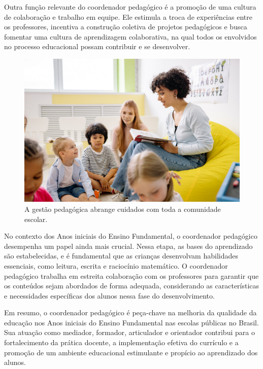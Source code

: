 Outra função relevante do coordenador pedagógico é a promoção de uma
cultura de colaboração e trabalho em equipe. Ele estimula a troca de
experiências entre os professores, incentiva a construção coletiva de
projetos pedagógicos e busca fomentar uma cultura de aprendizagem
colaborativa, na qual todos os envolvidos no processo educacional possam
contribuir e se desenvolver.

\begin{figure}
\centering
\includegraphics[width=\textwidth]{./imgs/Imagem003.jpg}
\caption{A gestão pedagógica abrange cuidados com toda a comunidade
escolar.}
\end{figure}

No contexto dos Anos iniciais do Ensino Fundamental, o coordenador
pedagógico desempenha um papel ainda mais crucial. Nessa etapa, as bases
do aprendizado são estabelecidas, e é fundamental que as crianças
desenvolvam habilidades essenciais, como leitura, escrita e raciocínio
matemático. O coordenador pedagógico trabalha em estreita colaboração
com os professores para garantir que os conteúdos sejam abordados de
forma adequada, considerando as características e necessidades
específicas dos alunos nessa fase do desenvolvimento.

Em resumo, o coordenador pedagógico é peça-chave na melhoria da
qualidade da educação nos Anos iniciais do Ensino Fundamental nas
escolas públicas no Brasil. Sua atuação como mediador, formador,
articulador e orientador contribui para o fortalecimento da prática
docente, a implementação efetiva do currículo e a promoção de um
ambiente educacional estimulante e propício ao aprendizado dos alunos.

